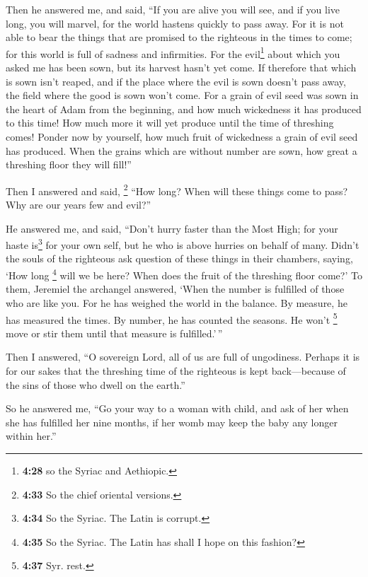  Then he answered me, and said, ``If you are alive you
will see, and if you live long, you will marvel, for the world hastens
quickly to pass away.  For it is not able to bear the
things that are promised to the righteous in the times to come; for this
world is full of sadness and infirmities.  For the
evil\footnote{\textbf{4:28} so the Syriac and Aethiopic.} about which
you asked me has been sown, but its harvest hasn't yet come.
 If therefore that which is sown isn't reaped, and if the
place where the evil is sown doesn't pass away, the field where the good
is sown won't come.  For a grain of evil seed was sown in
the heart of Adam from the beginning, and how much wickedness it has
produced to this time! How much more it will yet produce until the time
of threshing comes!  Ponder now by yourself, how much
fruit of wickedness a grain of evil seed has produced. 
When the grains which are without number are sown, how great a threshing
floor they will fill!''

 Then I answered and said, \footnote{\textbf{4:33} So the
  chief oriental versions.} ``How long? When will these things come to
pass? Why are our years few and evil?''

 He answered me, and said, ``Don't hurry faster than the
Most High; for your haste is\footnote{\textbf{4:34} So the Syriac. The
  Latin is corrupt.} for your own self, but he who is above hurries on
behalf of many.  Didn't the souls of the righteous ask
question of these things in their chambers, saying, `How long
\footnote{\textbf{4:35} So the Syriac. The Latin has shall I hope on
  this fashion?} will we be here? When does the fruit of the threshing
floor come?'  To them, Jeremiel the archangel answered,
`When the number is fulfilled of those who are like you. For he has
weighed the world in the balance.  By measure, he has
measured the times. By number, he has counted the seasons. He won't
\footnote{\textbf{4:37} Syr. rest.} move or stir them until that measure
is fulfilled.'\,''

 Then I answered, ``O sovereign Lord, all of us are full
of ungodiness.  Perhaps it is for our sakes that the
threshing time of the righteous is kept back---because of the sins of
those who dwell on the earth.''

 So he answered me, ``Go your way to a woman with child,
and ask of her when she has fulfilled her nine months, if her womb may
keep the baby any longer within her.''

